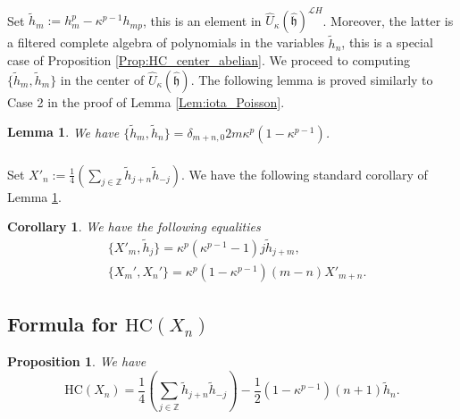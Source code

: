 \documentclass{amsart}
\newtheorem{Prop}[Thm]{Proposition}
\newtheorem{Cor}[Thm]{Corollary}
\newtheorem{Lem}[Thm]{Lemma}
\theoremstyle{definition}
\newcommand{\sss}{\subsubsection{}}
\newcommand{\hh}{\hat{\mathfrak{h}}}
\newcommand{\HC}{\mathrm{HC}} %
\newcommand{\Z}{\mathbb{Z}}
\newcommand{\Loop}{\mathscr{L}}
\numberwithin{equation}{section}
\begin{document}
\sss Set $\tilde{h}_m:=h_m^p-\kappa^{p-1}h_{mp}$, this is an element in $\widehat{U}_\kappa(\hh)^{\Loop H}$. Moreover, the latter is a filtered complete algebra of polynomials in the variables $\tilde{h}_n$, this is a special case of Proposition \ref{Prop:HC_center_abelian}.
We proceed to computing $\{\tilde{h}_{m},\tilde{h}_{m}\}$ in the center of $\widehat{U}_\kappa(\hh)$. 
The following lemma is proved similarly to Case 2 in the proof of Lemma \ref{Lem:iota_Poisson}.

\begin{Lem}\label{Lem:tilde_h_brackets}
We have $\{\tilde{h}_{m}, \tilde{h}_{n}\}=\delta_{m+n,0}2m\kappa^p(1-\kappa^{p-1})$. 
\end{Lem}

\sss 
Set $X'_n:=\frac{1}{4}\left(\sum_{j\in \Z}\tilde{h}_{j+n}\tilde{h}_{-j}\right)$. We have the following standard corollary of Lemma \ref{Lem:tilde_h_brackets}.

\begin{Cor}\label{Cor:Xprime_brackets}
We have the following equalities
\begin{align*}
&\{X'_m, \tilde{h}_{j}\}=\kappa^p(\kappa^{p-1}-1)j \tilde{h}_{j+m},\\
&\{X_m',X_n'\}=\kappa^p(1-\kappa^{p-1})(m-n)X'_{m+n}.
\end{align*}
\end{Cor}

\subsection{Formula for $\HC(X_n)$}\label{SS_HC_Xn_formula}
\begin{Prop}\label{Prop:HC_quadratic}
We have $$\HC(X_n)=\frac{1}{4}\left(\sum_{j\in \Z}\tilde{h}_{j+n}\tilde{h}_{-j}\right)-\frac{1}{2}(1-\kappa^{p-1})(n+1)\tilde{h}_{n}.$$
\end{Prop}
\end{document}
